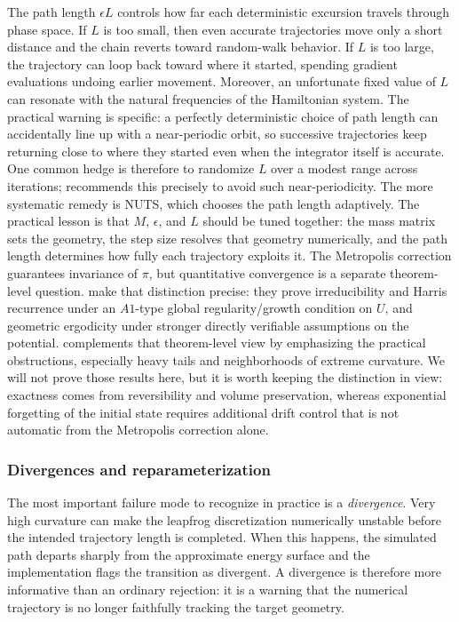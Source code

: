 The path length $\epsilon L$ controls how far each deterministic excursion travels through phase space.
If $L$ is too small, then even accurate trajectories move only a short distance and the chain reverts toward random-walk behavior.
If $L$ is too large, the trajectory can loop back toward where it started, spending gradient evaluations undoing earlier movement.
Moreover, an unfortunate fixed value of $L$ can resonate with the natural frequencies of the Hamiltonian system.
The practical warning is specific: a perfectly deterministic choice of path length can accidentally line up with a near-periodic orbit, so successive trajectories keep returning close to where they started even when the integrator itself is accurate.
One common hedge is therefore to randomize $L$ over a modest range across iterations; \citet[\S4, p.~25]{neal_2011_hmc} recommends this precisely to avoid such near-periodicity.
The more systematic remedy is NUTS, which chooses the path length adaptively.
The practical lesson is that $M$, $\epsilon$, and $L$ should be tuned together: the mass matrix sets the geometry, the step size resolves that geometry numerically, and the path length determines how fully each trajectory exploits it.
The Metropolis correction guarantees invariance of \(\pi\), but quantitative convergence is a separate theorem-level question.
\citet[Thms.~1--2 and 9]{durmus_moulines_saksman_2019_hmc_convergence} make that distinction precise: they prove irreducibility and Harris recurrence under an \(A1\)-type global regularity/growth condition on \(U\), and geometric ergodicity under stronger directly verifiable assumptions on the potential.
\citet[\S6]{betancourt_2017_hmc_conceptual} complements that theorem-level view by emphasizing the practical obstructions, especially heavy tails and neighborhoods of extreme curvature.
We will not prove those results here, but it is worth keeping the distinction in view: exactness comes from reversibility and volume preservation, whereas exponential forgetting of the initial state requires additional drift control that is not automatic from the Metropolis correction alone.

\subsubsection{Divergences and reparameterization}
\label{subsubsec:hmc-divergences}

The most important failure mode to recognize in practice is a \emph{divergence}.
Very high curvature can make the leapfrog discretization numerically unstable before the intended trajectory length is completed.
When this happens, the simulated path departs sharply from the approximate energy surface and the implementation flags the transition as divergent.
A divergence is therefore more informative than an ordinary rejection: it is a warning that the numerical trajectory is no longer faithfully tracking the target geometry.

